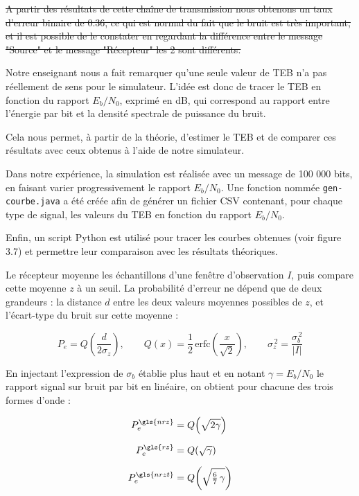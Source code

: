 \documentclass[a4paper,12pt]{report}
\begin{document}
\sout{A partir des résultats de cette chaîne de transmission nous obtenons un taux d'erreur binaire de 0.36, ce qui est normal du fait que le bruit est très important, et il est possible de le constater en regardant la différence entre le message "Source" et le message "Récepteur" les 2 sont différents.}

Notre enseignant nous a fait remarquer qu’une seule valeur de TEB n’a pas réellement de sens pour le simulateur. L’idée est donc de tracer le TEB en fonction du rapport $E_b/N_0$, exprimé en dB, qui correspond au rapport entre l’énergie par bit et la densité spectrale de puissance du bruit.

Cela nous permet, à partir de la théorie, d’estimer le TEB et de comparer ces résultats avec ceux obtenus à l’aide de notre simulateur.

Dans notre expérience, la simulation est réalisée avec un message de 100 000 bits, en faisant varier progressivement le rapport $E_b/N_0$. Une fonction nommée \texttt{gen-courbe.java} a été créée afin de générer un fichier CSV contenant, pour chaque type de signal, les valeurs du TEB en fonction du rapport $E_b/N_0$.

Enfin, un script Python est utilisé pour tracer les courbes obtenues (voir figure 3.7) et permettre leur comparaison avec les résultats théoriques.

Le récepteur moyenne les échantillons d'une fenêtre d'observation $I$, puis
compare cette moyenne $z$ à un seuil. La probabilité d'erreur ne dépend que de
deux grandeurs : la distance $d$ entre les deux valeurs moyennes possibles de
$z$, et l'écart-type du bruit sur cette moyenne :

\begin{equation*}
P_e = Q\!\left(\frac{d}{2\sigma_z}\right),
\qquad
Q(x) = \frac{1}{2}\,\mathrm{erfc}\!\left(\frac{x}{\sqrt{2}}\right),
\qquad
\sigma_z^{\,2} = \frac{\sigma_b^{\,2}}{|I|}
\end{equation*}

En injectant l'expression de $\sigma_b$ établie plus haut et en notant
$\gamma = E_b/N_0$ le rapport signal sur bruit par bit en linéaire, on obtient
pour chacune des trois formes d'onde :

\begin{align*}
P_e^{\gls{nrz}}  &= Q\!\left(\sqrt{2\gamma}\right) \\[6pt]
P_e^{\gls{rz}}   &= Q\!\left(\sqrt{\gamma}\right) \\[6pt]
P_e^{\gls{nrzt}} &= Q\!\left(\sqrt{\tfrac{6}{7}\,\gamma}\right)
\end{align*}
\end{document}
